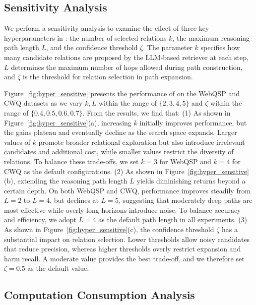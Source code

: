 

\subsection{Sensitivity Analysis}

We perform a sensitivity analysis to examine the effect of three key hyperparameters in \method{}: the number of selected relations $k$, the maximum reasoning path length $L$, and the confidence threshold $\zeta$. The parameter $k$ specifies how many candidate relations are proposed by the LLM-based retriever at each step, $L$ determines the maximum number of hops allowed during path construction, and $\zeta$ is the threshold for relation selection in path expansion.

Figure~\ref{fig:hyper_sensitive} presents the performance of \method{} on the WebQSP and CWQ datasets as we vary $k, L$ within the range of $\{2,3,4,5\}$ and $\zeta$ within the range of $\{0.4,0.5,0.6,0.7\}$. From the results, we find that: (1) As shown in Figure~\ref{fig:hyper_sensitive}(a), increasing $k$ initially improves performance, but the gains plateau and eventually decline as the search space expands. Larger values of $k$ promote broader relational exploration but also introduce irrelevant candidates and additional cost, while smaller values restrict the diversity of relations. To balance these trade-offs, we set $k=3$ for WebQSP and $k=4$ for CWQ as the default configurations. (2) As shown in Figure~\ref{fig:hyper_sensitive}(b), extending the reasoning path length $L$ yields diminishing returns beyond a certain depth. On both WebQSP and CWQ, performance improves steadily from $L=2$ to $L=4$, but declines at $L=5$, suggesting that moderately deep paths are most effective while overly long horizons introduce noise. To balance accuracy and efficiency, we adopt $L=4$ as the default path length in all experiments. (3) As shown in Figure~\ref{fig:hyper_sensitive}(c), the confidence threshold $\zeta$ has a substantial impact on relation selection. Lower thresholds allow noisy candidates that reduce precision, whereas higher thresholds overly restrict expansion and harm recall. A moderate value provides the best trade-off, and we therefore set $\zeta=0.5$ as the default value. 





\subsection{Computation Consumption Analysis}

